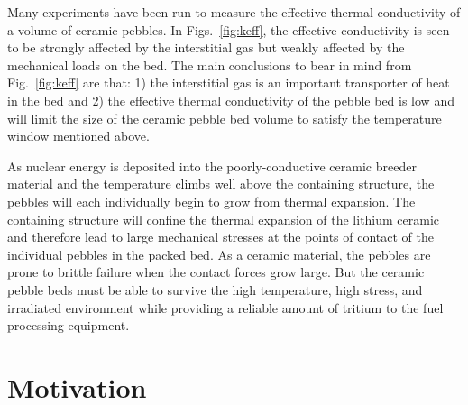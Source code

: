 Many experiments have been run to measure the effective thermal conductivity of a volume of ceramic pebbles. In Figs.~\ref{fig:keff}, the effective conductivity is seen to be strongly affected by the interstitial gas but weakly affected by the mechanical loads on the bed. The main conclusions to bear in mind from Fig.~\ref{fig:keff} are that: 1) the interstitial gas is an important transporter of heat in the bed and 2) the effective thermal conductivity of the pebble bed is low and will limit the size of the ceramic pebble bed volume to satisfy the temperature window mentioned above.


As nuclear energy is deposited into the poorly-conductive ceramic breeder material and the temperature climbs well above the containing structure, the pebbles will each individually begin to grow from thermal expansion. The containing structure will confine the thermal expansion of the lithium ceramic and therefore lead to large mechanical stresses at the points of contact of the individual pebbles in the packed bed. As a ceramic material, the pebbles are prone to brittle failure when the contact forces grow large. But the ceramic pebble beds must be able to survive the high temperature, high stress, and irradiated environment while providing a reliable amount of tritium to the fuel processing equipment.






\section{Motivation}\label{sec:motivation}

